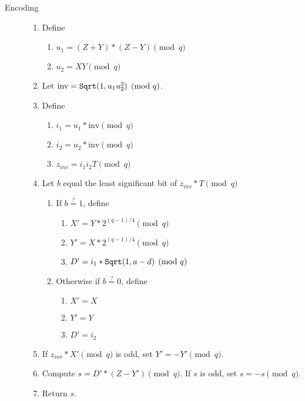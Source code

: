 \begin{description}
	\item[Encoding] \hfill
        \begin{enumerate}
            \item Define
                \begin{enumerate}
                    \item $u_1 = (Z + Y)*(Z - Y) \pmod q$
                    \item $u_2 = X Y \pmod q$
                \end{enumerate}
            \item Let $\textrm{inv} = \textrm{{\tt Sqrt}}(1, u_1 u^2_2) \pmod q$.
            \item Define
            \begin{enumerate}
                \item $i_1 = u_1*\textrm{inv} \pmod q$
                \item $i_2 = u_2*\textrm{inv} \pmod q$
                \item $z_{inv} = i_1 i_2 T \pmod q$
            \end{enumerate}
            \item Let $b$ equal the least significant bit of $z_{inv} * T \pmod q$
            \begin{enumerate}
                \item If $b \stackrel{?}{=} 1$, define
                \begin{enumerate}
                    \item $X' = Y * 2^{(q-1)/4} \pmod q$
                    \item $Y' = X * 2^{(q-1)/4} \pmod q$
                    \item $D' = i_1 * \textrm{{\tt Sqrt}}(1, a - d) \pmod q$
                \end{enumerate}
                \item Otherwise if $b \stackrel{?}{=} 0$, define
                \begin{enumerate}
                    \item $X' = X$
                    \item $Y' = Y$
                    \item $D' = i_2$
                \end{enumerate}
            \end{enumerate}
            \item If $z_{inv} * X' \pmod q$ is odd, set $Y' = -Y' \pmod q$.
            \item Compute $s = D' * (Z - Y') \pmod q$. If $s$ is odd, set $s = -s \pmod q$.
            \item Return $s$.
        \end{enumerate}


\end{description}
